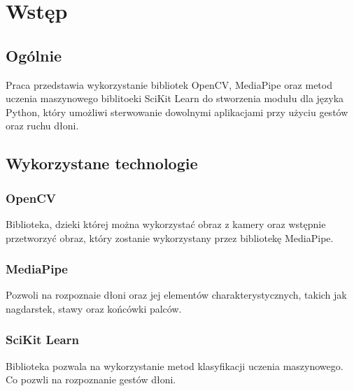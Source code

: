 \chapter{Wstęp}

\section{Ogólnie}

Praca przedstawia wykorzystanie bibliotek OpenCV, MediaPipe oraz metod 
uczenia maszynowego biblitoeki SciKit Learn do stworzenia modułu dla 
języka Python, który umożliwi sterwowanie dowolnymi aplikacjami przy 
użyciu gestów oraz ruchu dłoni.

\section{Wykorzystane technologie}
\subsection{OpenCV}
Biblioteka, dzieki której można wykorzystać obraz z kamery oraz wstępnie
przetworzyć obraz, który zostanie wykorzystany przez bibliotekę MediaPipe.

\subsection{MediaPipe}
Pozwoli na rozpoznaie dłoni oraz jej elementów charakterystycznych, 
takich jak nagdarstek, stawy oraz końcówki palców. 

\subsection{SciKit Learn}
Biblioteka pozwala na wykorzystanie metod klasyfikacji uczenia maszynowego. 
Co pozwli na rozpoznanie gestów dłoni. 
